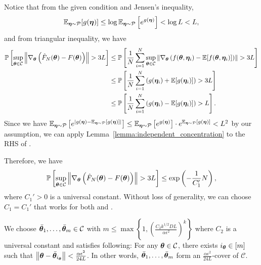Notice that from the given condition and Jensen's inequality, 
\begin{equation*}
    \mathbb{E}_{{\bm{\eta}} \sim \mathcal{P}}[g({\bm{\eta}})] \leq \log \mathbb{E}_{{\bm{\eta}} \sim \mathcal{P}}\left[e^{g({\bm{\eta}})}\right] < \log L <L,
\end{equation*}
and from triangular inequality, we have
\begin{align}
\label{eq:lemmaminimizer_independent-1}
 \mathbb{P}\left[ \sup_{{\bm{\theta}} \in \mathcal{C}}\left\lVert \nabla_{\bm{\theta}} \left( \hat{F}_N({\bm{\theta}}) - F({\bm{\theta}}) \right)\right\rVert > 3 L \right] 
 &\leq \mathbb{P}\left[ \frac{1}{N} \sum_{i=1}^N \sup_{{\bm{\theta}} \in \mathcal{C}}\left\lVert \nabla_{\bm{\theta}} \left( f({\bm{\theta}}, {\bm{\eta}}_i) - \mathbb{E}[f({\bm{\theta}}, {\bm{\eta}}_i)] \right)\right\rVert > 3 L\right]\nonumber \\
 &\leq \mathbb{P} \left[ \frac{1}{N} \sum_{i=1}^N \left( g({\bm{\eta}}_i) + \mathbb{E}[g({\bm{\eta}}_i)] \right)> 3 L \right] \nonumber \\
 &\leq \mathbb{P} \left[ \frac{1}{N} \sum_{i=1}^N \left( g({\bm{\eta}}_i) - \mathbb{E}[g({\bm{\eta}}_i)] \right)> L \right].
\end{align}
Since we have $\mathbb{E}_{{\bm{\eta}} \sim \mathcal{P}}\left [e^{ |g({\bm{\eta}}) - \mathbb{E}_{{\bm{\eta}}\sim \mathcal{
P}}[g({\bm{\eta}})]|} \right] \leq \mathbb{E}_{{\bm{\eta}} \sim \mathcal{P}}\left [e^{ g({\bm{\eta}})} \right] \cdot e^{\mathbb{E}_{{\bm{\eta}}\sim \mathcal{
P}}[g({\bm{\eta}})] }<L^2$ by our assumption, we can apply Lemma~\ref{lemma:independent_concentration} to the RHS of .

Therefore, we have
\begin{equation}
\label{eq:lemmaminimizer_independent-3}
 \mathbb{P}\left[ \sup_{{\bm{\theta}} \in \mathcal{C}}\left\lVert \nabla_{\bm{\theta}} \left( \hat{F}_N({\bm{\theta}}) - F({\bm{\theta}}) \right)\right\rVert > 3 L \right] 
 \leq \exp \left(-\frac{1}{C_1'}N\right),
\end{equation}
where $C_1'>0$ is a universal constant. Without loss of generality, we can choose $C_1 = C_1'$ that works for both  and .

We choose $\bar{{\bm{\theta}}}_1, \dots, \bar{{\bm{\theta}}}_m \in \mathcal{C}$ with $m \leq \max \left\{ 1, \left(\frac{C_2 k^{1/2} D  L}{\alpha \epsilon^2 }\right)^k \right\}$ where $C_2$ is a universal constant and satisfies following: 
For any ${\bm{\theta}} \in \mathcal{C}$, there exists $i_{\bm{\theta}} \in [m]$ such that $\left \lVert {\bm{\theta}} - \bar{{\bm{\theta}}}_{i_{\bm{\theta}}} \right \rVert<  \frac{\alpha \epsilon^2}{24  L}$. In other words, $\bar{{\bm{\theta}}}_1, \dots, \bar{{\bm{\theta}}}_m$ form an $\frac{\alpha \epsilon^2}{24L}$-cover of $\mathcal {C}$.

